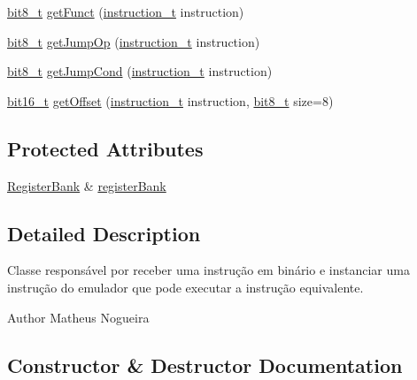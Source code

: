 \begin{DoxyCompactItemize}
\item 
\hyperlink{core_8hpp_a6074bae122ae7b527864eec42c728c3c}{bit8\+\_\+t} \hyperlink{classMIPS_1_1InstructionDecoder_aa7148e0ad81662725be7203837a4e46c}{get\+Funct} (\hyperlink{core_8hpp_aa514fd240a0e29abb2a2e4c805d7f1a4}{instruction\+\_\+t} instruction)
\item 
\hyperlink{core_8hpp_a6074bae122ae7b527864eec42c728c3c}{bit8\+\_\+t} \hyperlink{classMIPS_1_1InstructionDecoder_ab0e5dc987aa8c65f78aaba3ba242673b}{get\+Jump\+Op} (\hyperlink{core_8hpp_aa514fd240a0e29abb2a2e4c805d7f1a4}{instruction\+\_\+t} instruction)
\item 
\hyperlink{core_8hpp_a6074bae122ae7b527864eec42c728c3c}{bit8\+\_\+t} \hyperlink{classMIPS_1_1InstructionDecoder_afef4b26e3420aa5a32473593868703d2}{get\+Jump\+Cond} (\hyperlink{core_8hpp_aa514fd240a0e29abb2a2e4c805d7f1a4}{instruction\+\_\+t} instruction)
\item 
\hyperlink{core_8hpp_adc265a970bc35995b5879784bbb3f1b7}{bit16\+\_\+t} \hyperlink{classMIPS_1_1InstructionDecoder_a09ba48d5683432c3a303b8c42367755f}{get\+Offset} (\hyperlink{core_8hpp_aa514fd240a0e29abb2a2e4c805d7f1a4}{instruction\+\_\+t} instruction, \hyperlink{core_8hpp_a6074bae122ae7b527864eec42c728c3c}{bit8\+\_\+t} size=8)
\end{DoxyCompactItemize}
\subsection*{Protected Attributes}
\begin{DoxyCompactItemize}
\item 
\hyperlink{classMIPS_1_1RegisterBank}{Register\+Bank} \& \hyperlink{classMIPS_1_1InstructionDecoder_a6796453642fca3384868a9539656ab45}{register\+Bank}
\end{DoxyCompactItemize}


\subsection{Detailed Description}
Classe responsável por receber uma instrução em binário e instanciar uma instrução do emulador que pode executar a instrução equivalente.

\begin{DoxyAuthor}{Author}
Matheus Nogueira 
\end{DoxyAuthor}


\subsection{Constructor \& Destructor Documentation}
